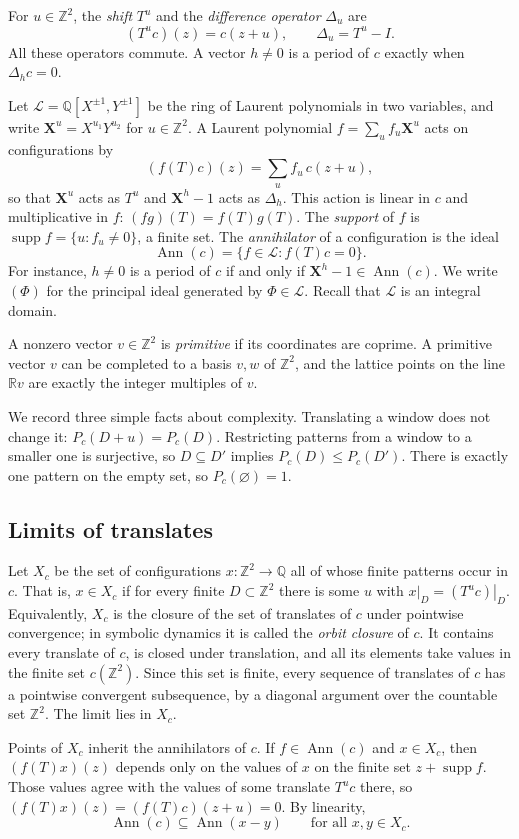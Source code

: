 \documentclass[11pt,a4paper,reqno]{amsart}
\theoremstyle{definition}
\theoremstyle{remark}
\newcommand{\Z}{\mathbb Z}
\newcommand{\Q}{\mathbb Q}
\newcommand{\R}{\mathbb R}
\newcommand{\LL}{\mathcal L}
\newcommand{\mon}[1]{\boldsymbol X^{#1}}
\newcommand{\De}{\Delta}
\newcommand{\restr}[2]{\left.#1\right|_{#2}}
\DeclareMathOperator{\Ann}{Ann}
\DeclareMathOperator{\supp}{supp}
\numberwithin{equation}{section}
\begin{document}
For $u\in\Z^2$, the \emph{shift} $T^u$ and the \emph{difference operator} $\De_u$ are
\[
 (T^uc)(z)=c(z+u),\qquad \De_u=T^u-I.
\]
All these operators commute. A vector $h\ne0$ is a period of $c$ exactly when $\De_hc=0$.

Let $\LL=\Q[X^{\pm1},Y^{\pm1}]$ be the ring of Laurent polynomials in two variables, and write $\mon u=X^{u_1}Y^{u_2}$ for $u\in\Z^2$. A Laurent polynomial $f=\sum_uf_u\mon u$ acts on configurations by
\[
 (f(T)c)(z)=\sum_uf_u\,c(z+u),
\]
so that $\mon u$ acts as $T^u$ and $\mon h-1$ acts as $\De_h$. This action is linear in $c$ and multiplicative in $f$: $(fg)(T)=f(T)g(T)$. The \emph{support} of $f$ is $\supp f=\{u:f_u\ne0\}$, a finite set. The \emph{annihilator} of a configuration is the ideal
\[
 \Ann(c)=\{f\in\LL: f(T)c=0\}.
\]
For instance, $h\ne0$ is a period of $c$ if and only if $\mon h-1\in\Ann(c)$. We write $(\Phi)$ for the principal ideal generated by $\Phi\in\LL$. Recall that $\LL$ is an integral domain.

A nonzero vector $v\in\Z^2$ is \emph{primitive} if its coordinates are coprime. A primitive vector $v$ can be completed to a basis $v,w$ of $\Z^2$, and the lattice points on the line $\R v$ are exactly the integer multiples of $v$.

We record three simple facts about complexity. Translating a window does not change it: $P_c(D+u)=P_c(D)$. Restricting patterns from a window to a smaller one is surjective, so $D\subseteq D'$ implies $P_c(D)\le P_c(D')$. There is exactly one pattern on the empty set, so $P_c(\varnothing)=1$.

\subsection{Limits of translates}
Let $X_c$ be the set of configurations $x\colon\Z^2\to\Q$ all of whose finite patterns occur in $c$. That is, $x\in X_c$ if for every finite $D\subset\Z^2$ there is some $u$ with $\restr{x}{D}=\restr{(T^uc)}{D}$. Equivalently, $X_c$ is the closure of the set of translates of $c$ under pointwise convergence; in symbolic dynamics it is called the \emph{orbit closure} of $c$. It contains every translate of $c$, is closed under translation, and all its elements take values in the finite set $c(\Z^2)$. Since this set is finite, every sequence of translates of $c$ has a pointwise convergent subsequence, by a diagonal argument over the countable set $\Z^2$. The limit lies in $X_c$.

Points of $X_c$ inherit the annihilators of $c$. If $f\in\Ann(c)$ and $x\in X_c$, then $(f(T)x)(z)$ depends only on the values of $x$ on the finite set $z+\supp f$. Those values agree with the values of some translate $T^uc$ there, so $(f(T)x)(z)=(f(T)c)(z+u)=0$. By linearity,
\begin{equation}\label{eq:inheritance}
 \Ann(c)\subseteq\Ann(x-y)\qquad\text{for all }x,y\in X_c.
\end{equation}
\end{document}
